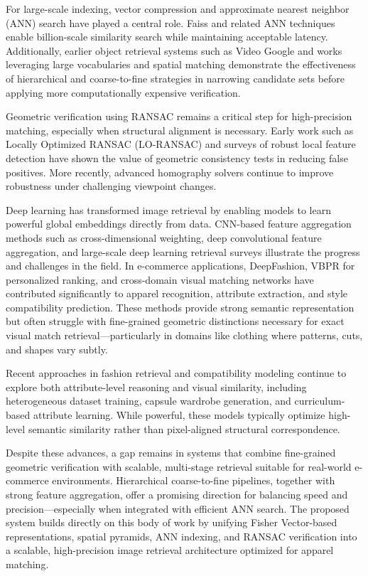 \documentclass[conference]{IEEEtran}
\begin{document}
For large-scale indexing, vector compression and approximate nearest neighbor (ANN) search have played a central role. Faiss and related ANN techniques enable billion-scale similarity search while maintaining acceptable latency. Additionally, earlier object retrieval systems such as Video Google and works leveraging large vocabularies and spatial matching demonstrate the effectiveness of hierarchical and coarse-to-fine strategies in narrowing candidate sets before applying more computationally expensive verification.

Geometric verification using RANSAC remains a critical step for high-precision matching, especially when structural alignment is necessary. Early work such as Locally Optimized RANSAC (LO-RANSAC) and surveys of robust local feature detection have shown the value of geometric consistency tests in reducing false positives. More recently, advanced homography solvers continue to improve robustness under challenging viewpoint changes.

Deep learning has transformed image retrieval by enabling models to learn powerful global embeddings directly from data. CNN-based feature aggregation methods such as cross-dimensional weighting, deep convolutional feature aggregation, and large-scale deep learning retrieval surveys illustrate the progress and challenges in the field. In e-commerce applications, DeepFashion, VBPR for personalized ranking, and cross-domain visual matching networks have contributed significantly to apparel recognition, attribute extraction, and style compatibility prediction. These methods provide strong semantic representation but often struggle with fine-grained geometric distinctions necessary for exact visual match retrieval—particularly in domains like clothing where patterns, cuts, and shapes vary subtly.

Recent approaches in fashion retrieval and compatibility modeling continue to explore both attribute-level reasoning and visual similarity, including heterogeneous dataset training, capsule wardrobe generation, and curriculum-based attribute learning. While powerful, these models typically optimize high-level semantic similarity rather than pixel-aligned structural correspondence.

Despite these advances, a gap remains in systems that combine fine-grained geometric verification with scalable, multi-stage retrieval suitable for real-world e-commerce environments. Hierarchical coarse-to-fine pipelines, together with strong feature aggregation, offer a promising direction for balancing speed and precision—especially when integrated with efficient ANN search. The proposed system builds directly on this body of work by unifying Fisher Vector-based representations, spatial pyramids, ANN indexing, and RANSAC verification into a scalable, high-precision image retrieval architecture optimized for apparel matching.
\end{document}
